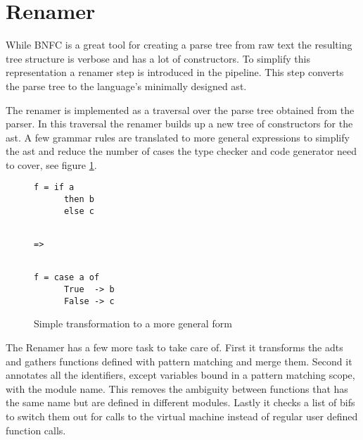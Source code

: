 \section{Renamer}


While BNFC is a great tool for creating a parse tree from raw text the resulting tree structure is verbose and has a lot of constructors. To simplify this representation a renamer step is introduced in the pipeline. This step converts the parse tree to the language's minimally designed \gls{ast}. 

The renamer is implemented as a traversal over the parse tree obtained from the parser. In this traversal the renamer builds up a new tree of constructors for the \gls{ast}. A few grammar rules are translated to more general expressions to simplify the \gls{ast} and reduce the number of cases the type checker and code generator need to cover, see figure \ref{lst:renamer1}.

\begin{figure}[ht]
\centering
{}%
\begin{minipage}[b]{0.30\linewidth}
    \centering
    \begin{lstlisting}
f = if a
      then b
      else c
    \end{lstlisting}
\end{minipage}
\begin{minipage}[b]{0.09\linewidth}
    \centering
    \begin{lstlisting}
    
=>
 
    \end{lstlisting}
\end{minipage}
\begin{minipage}[b]{0.30\linewidth}
    \centering
    \begin{lstlisting}
f = case a of
      True  -> b
      False -> c
    \end{lstlisting}
\end{minipage}
\caption{Simple transformation to a more general form}
\label{lst:renamer1}
\end{figure}

The Renamer has a few more task to take care of. First it transforms the \glspl{adt} and gathers functions defined with pattern matching and merge them. Second it annotates all the identifiers, except variables bound in a pattern matching scope, with the module name. This removes the ambiguity between functions that has the same name but are defined in different modules. Lastly it checks a list of \glspl{bif} to switch them out for calls to the virtual machine instead of regular user defined function calls.

